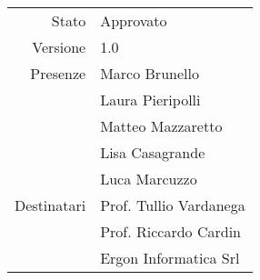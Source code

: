 \begin{center}
\begin{tabular}{r|l}
	Stato & Approvato \\
	Versione & 1.0 \\
	Presenze & Marco Brunello \\
	         & Laura Pieripolli \\
	         & Matteo Mazzaretto \\
	         & Lisa Casagrande \\
	         & Luca Marcuzzo \\
	Destinatari & Prof. Tullio Vardanega \\
	            & Prof. Riccardo Cardin \\
				& Ergon Informatica Srl
\end{tabular}
\end{center}